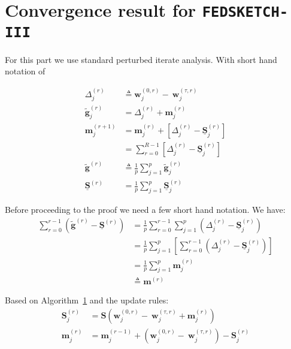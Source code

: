
\section{Convergence result for \texttt{FEDSKETCH-III}}
For this part we use standard perturbed iterate analysis. With short hand notation of 

\begin{align}
\Delta_j^{(r)}&\triangleq\boldsymbol{w}_j^{(0,r)}-~{\boldsymbol{w}}_{j}^{(\tau,r)}\nonumber\\
\tilde{\mathbf{g}}^{(r)}_j&=\Delta_j^{(r)}+\mathbf{m}_j^{(r)}\nonumber\\
\mathbf{m}_j^{(r+1)}&=\mathbf{m}_j^{(r)}+\left[\Delta_j^{(r)}-\underline{\mathbf{S}}_j^{(r)}\right]\nonumber\\
&=\sum_{r=0}^{R-1}\left[\Delta_j^{(r)}-\underline{\mathbf{S}}_j^{(r)}\right]\nonumber\\
\tilde{\mathbf{g}}^{(r)}&\triangleq\frac{1}{p}\sum_{j=1}^p\tilde{\mathbf{g}}_j^{(r)}\nonumber\\
\underline{\mathbf{S}}^{(r)}&=\frac{1}{p}\sum_{j=1}^p\underline{\mathbf{S}}^{(r)}_j
\end{align}


Before proceeding to the proof we need a few short hand notation. We have:
\begin{align}
     \sum_{r=0}^{r-1}\left(\tilde{\mathbf{g}}^{(r)}-\underline{\mathbf{S}}^{(r)}\right)&{=} \frac{1}{p}\sum_{r=0}^{r-1}\sum_{j=1}^p\left(\Delta_j^{(r)}-\underline{\mathbf{S}}^{(r)}_j\right)\nonumber\\
    &= \frac{1}{p}\sum_{j=1}^p\left[\sum_{r=0}^{r-1}\left(\Delta_j^{(r)}-\underline{\mathbf{S}}^{(r)}_j\right)\right]\nonumber\\
    &= \frac{1}{p}\sum_{j=1}^p\mathbf{m}_j^{(r)}\nonumber\\
    &\triangleq\mathbf{m}^{(r)}
\end{align}

Based on Algorithm~\ref{} and the update rules:
\begin{align}
\mathbf{S}_j^{(r)}&=\mathbf{S}\left(\boldsymbol{w}_j^{(0,r)}-~{\boldsymbol{w}}_{j}^{(\tau,r)}+\mathbf{m}_j^{(r)}\right)\nonumber\\
\mathbf{m}_j^{(r)}&=\mathbf{m}_j^{(r-1)}+\left(\boldsymbol{w}_j^{(0,r)}-~{\boldsymbol{w}}_{j}^{(\tau,r)}\right)-\mathbf{S}_j^{(r)}
\end{align}

